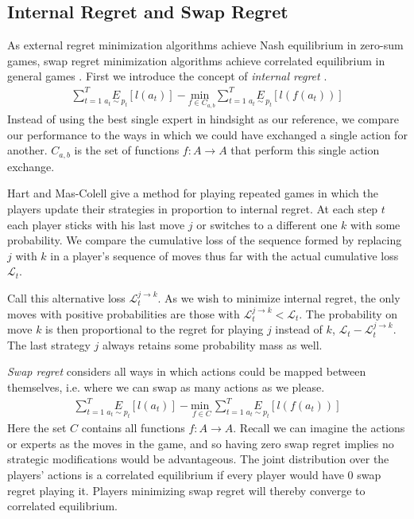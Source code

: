 \documentclass{article}
\begin{document}
\subsection{Internal Regret and Swap Regret}

As external regret minimization algorithms achieve Nash equilibrium in zero-sum games, swap regret minimization algorithms achieve correlated equilibrium in general games \cite{blum2007external}. First we introduce the concept of \emph{internal regret} \cite{foster1998asymptotic}.
\begin{align*}
\sum_{t=1}^T \underset{a_t \sim p_t}{E}[l(a_t)] - \underset{f \in C_{a,b}}{\text{min }} \sum_{t=1}^T \underset{a_t \sim p_t}{E}[l(f(a_t))]
\end{align*}
Instead of using the best single expert in hindsight as our reference, we compare our performance to the ways in which we could have exchanged a single action for another. $C_{a,b}$ is the set of functions $f: A \rightarrow A$ that perform this single action exchange.

Hart and Mas-Colell\cite{hart2000simple} give a method for playing repeated games in which the players update their strategies in proportion to internal regret. At each step $t$ each player sticks with his last move $j$ or switches to a different one $k$ with some probability. We compare the cumulative loss of the sequence formed by replacing $j$ with $k$ in a player's sequence of moves thus far with the actual cumulative loss $\mathcal{L}_t$.

Call this alternative loss $\mathcal{L}_t^{j\rightarrow k}$. As we wish to minimize internal regret, the only moves with positive probabilities are those with $\mathcal{L}_t^{j\rightarrow k} < \mathcal{L}_t$. The probability on move $k$ is then proportional to the regret for playing $j$ instead of $k$, $\mathcal{L}_t - \mathcal{L}_t^{j\rightarrow k}$. The last strategy $j$ always retains some probability mass as well.

\emph{Swap regret} considers all ways in which actions could be mapped between themselves, i.e. where we can swap as many actions as we please.
\begin{align*}
\sum_{t=1}^T \underset{a_t \sim p_t}{E}[l(a_t)] - \underset{f \in C}{\text{min }} \sum_{t=1}^T \underset{a_t \sim p_t}{E}[l(f(a_t))]
\end{align*}
Here the set $C$ contains all functions $f: A \rightarrow A$. Recall we can imagine the actions or experts as the moves in the game, and so having zero swap regret implies no strategic modifications would be advantageous. The joint distribution over the players' actions is a correlated equilibrium if every player would have 0 swap regret playing it. Players minimizing swap regret will thereby converge to correlated equilibrium.
\end{document}
